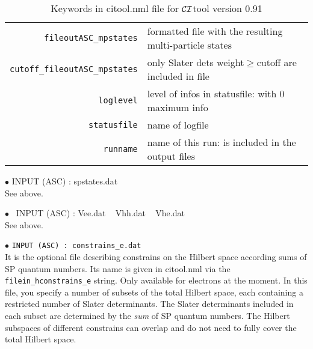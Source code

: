 \documentclass[12pt,twoside]{article}
\newcommand*{\CItool}[0]{{$\cal CI$}\textsf{tool} }
\begin{document}
\begin{table}
\begin{tabular}{r|l}
\verb#fileoutASC_mpstates# & formatted file with the resulting multi-particle states \\
\verb#cutoff_fileoutASC_mpstates# & only Slater dets weight$\geq$cutoff are included in file\\
\verb#loglevel# & level of infos in statusfile: with 0 maximum info\\
\verb#statusfile# & name of logfile \\
\verb#runname# & name of this run: is included in the output files \\
\end{tabular}
\caption{Keywords in \textsf{citool.nml} file for \CItool version 0.91}
\label{tab:citoolnmlkey}
\end{table}

$\bullet$ \textsf{INPUT (ASC) : spstates.dat} 
\\ 
See above.

$\bullet$ \ \textsf{INPUT (ASC) : Vee.dat ~ Vhh.dat ~ Vhe.dat}
\\
See above.

$\bullet$ \verb#INPUT (ASC) : constrains_e.dat#
\\
It is the optional file describing constrains on the Hilbert space
according sums of SP quantum numbers.  Its name is given in
\textsf{citool.nml} via the \verb#filein_hconstrains_e# string.  Only
available for electrons at the moment.  In this file, you specify a
number of subsets of the total Hilbert space, each containing a
restricted number of Slater determinants. The Slater determinants
included in each subset are determined by the \emph{sum} of SP quantum
numbers.  The Hilbert subspaces of different constrains can overlap
and do not need to fully cover the total Hilbert space.
\end{document}
